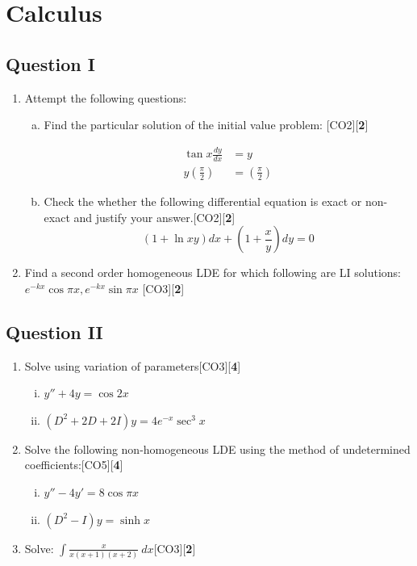 \documentclass[a4paper]{article}
\begin{document}
\section{Calculus}
\subsection*{Question I}
\begin{enumerate}
\item Attempt the following questions:
	\begin{enumerate}[a)]
	\item Find the particular solution of the initial value problem: \hfill [CO2][{\bf 2}]
	
		\begin{align*}
	\tan x\frac{dy}{dx}&=y
	\\y(\frac{\pi}{2})&=(\frac{\pi}{2})
		\end{align*} 
	
	\item Check the whether the following differential equation is exact or non-exact and justify your answer.\hfill [CO2][{\bf 2}]
	 	\begin{equation*}
	 (1 + \ln xy)dx + (1 + \frac{x}{y})dy = 0
		\end{equation*} 
	\end{enumerate}
\item Find a second order homogeneous LDE for which following are LI solutions: $ e^{-kx}\cos {\pi x}, e^{-kx}\sin {\pi x} $ \hfill [CO3][{\bf 2}]
\end{enumerate}

\subsection*{Question II}
\begin{enumerate}
\item Solve using variation of parameters\hfill [CO3][{\bf 4}]
	\begin{enumerate}[i)]
	\item $ y'' + 4y = \cos{2x} $
	\item $(D^2 + 2D + 2I)y = 4e^{-x} \sec^3 x $
	\end{enumerate}
\item Solve the following non-homogeneous LDE using the method of undetermined coefficients:\hfill [CO5][{\bf 4}]
	\begin{enumerate}[i)]
	\item $y'' - 4y' = 8 \cos {\pi x}$
	\item $(D^2 - I)y = \sinh x $
	\end{enumerate}
\item Solve: $ \int \frac{x}{x(x+1)(x+2)} \ dx $\hfill [CO3][{\bf 2}]
\end{enumerate}
\end{document}
